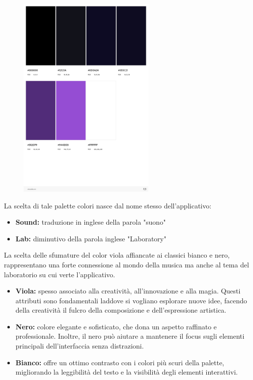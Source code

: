 \documentclass{article}
\begin{document}
		\begin{figure}[H]
			\centering
			\includegraphics[width=0.6\textwidth]{palette}
		\end{figure}
		La scelta di tale palette colori nasce dal nome stesso dell'applicativo:
		\begin{itemize}
			\item \textbf{Sound:} traduzione in inglese della parola "suono"
			\item \textbf{Lab:} diminutivo della parola inglese "Laboratory"
		\end{itemize}
		La scelta delle sfumature del color viola affiancate ai classici bianco e nero, rappresentano una forte connessione al mondo della musica ma anche al tema del laboratorio su cui verte l'applicativo.
		\begin{itemize}
			\item \textbf{Viola:} spesso associato alla creatività, all'innovazione e alla magia. Questi attributi sono fondamentali laddove si vogliano esplorare nuove idee, facendo della creatività il fulcro della composizione e dell'espressione artistica.
			\item \textbf{Nero:} colore elegante e sofisticato, che dona un aspetto raffinato e professionale. Inoltre, il nero può aiutare a mantenere il focus sugli elementi principali dell'interfaccia senza distrazioni.
			\item \textbf{Bianco:} offre un ottimo contrasto con i colori più scuri della palette, migliorando la leggibilità del testo e la visibilità degli elementi interattivi.
		\end{itemize}
\end{document}
